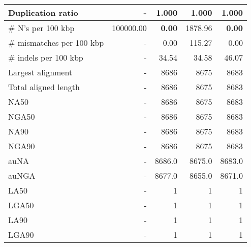 \documentclass[12pt,a4paper]{article}
\begin{document}
\begin{table}[ht]
\begin{center}
\begin{tabular}{|l*{4}{|r}|}
Duplication ratio & - & 1.000 & 1.000 & 1.000 \\ \hline
\# N's per 100 kbp & 100000.00 & {\bf 0.00} & 1878.96 & {\bf 0.00} \\ \hline
\# mismatches per 100 kbp & - & 0.00 & 115.27 & 0.00 \\ \hline
\# indels per 100 kbp & - & 34.54 & 34.58 & 46.07 \\ \hline
Largest alignment & - & 8686 & 8675 & 8683 \\ \hline
Total aligned length & - & 8686 & 8675 & 8683 \\ \hline
NA50 & - & 8686 & 8675 & 8683 \\ \hline
NGA50 & - & 8686 & 8675 & 8683 \\ \hline
NA90 & - & 8686 & 8675 & 8683 \\ \hline
NGA90 & - & 8686 & 8675 & 8683 \\ \hline
auNA & - & 8686.0 & 8675.0 & 8683.0 \\ \hline
auNGA & - & 8677.0 & 8655.0 & 8671.0 \\ \hline
LA50 & - & 1 & 1 & 1 \\ \hline
LGA50 & - & 1 & 1 & 1 \\ \hline
LA90 & - & 1 & 1 & 1 \\ \hline
LGA90 & - & 1 & 1 & 1 \\ \hline
\end{tabular}
\end{center}
\end{table}
\end{document}
